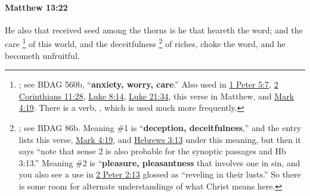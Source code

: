 		\paragraph{Matthew 13:22} %
			\label{MATTHEW-13-22}

			He also that received seed among the thorns is he that heareth the word; and the care%
				\footnote{%
					\label{MERIMNA}%
					; see BDAG 560b, ``\textbf{anxiety, worry, care}.'' Also used in \hyperref[1PETER-5-7]{1 Peter 5:7}, \hyperref[2CORINTHIANS-11-28]{2 Corinthians 11:28}, \hyperref[LUKE-8-14]{Luke 8:14}, \hyperref[LUKE-21-34]{Luke 21:34}, this verse in Matthew, and \hyperref[MARK-4-19]{Mark 4:19}. There is a verb, , which is used much more frequently.
					}
			of this world, and the deceitfulness%
				\footnote{%
					\label{APATE}%
					; see BDAG 86b. Meaning \#1 is ``\textbf{deception, deceitfulness},'' and the entry lists this verse, \hyperref[MARK-4-19]{Mark 4:19}, and \hyperref[HEBREWS-3-13]{Hebrews 3:13} under this meaning, but then it says ``note that sense 2 is also probable for the synoptic passages and Hb 3:13.'' Meaning \#2 is ``\textbf{pleasure, pleasantness} that involves one in sin, and you also see a use in \hyperref[2PETER-2-13]{2 Peter 2:13} glossed as ``reveling in their lusts.'' So there is some room for alternate understandings of what Christ means here.
					}
			of riches, choke the word, and he becometh unfruitful.

			\begin{framed}
			\scriptsize
				\begin{compactdesc}
					\item[SBLG] 
				\end{compactdesc}
			\end{framed}

